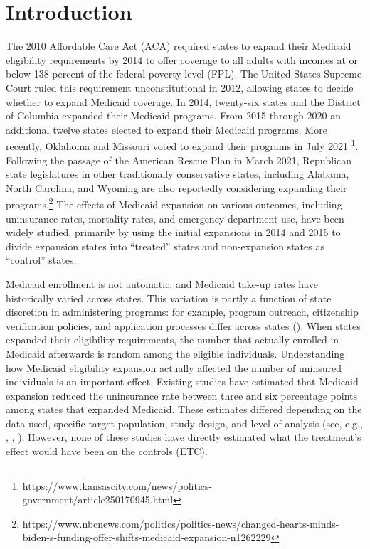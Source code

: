 \documentclass[aoas]{imsart}
\theoremstyle{plain}
\theoremstyle{remark}
\begin{document}


\section{Introduction}

The 2010 Affordable Care Act (ACA) required states to expand their Medicaid eligibility requirements by 2014 to offer coverage to all adults with incomes at or below 138 percent of the federal poverty level (FPL). The United States Supreme Court ruled this requirement unconstitutional in 2012, allowing states to decide whether to expand Medicaid coverage. In 2014, twenty-six states and the District of Columbia expanded their Medicaid programs. From 2015 through 2020 an additional twelve states elected to expand their Medicaid programs. More recently, Oklahoma and Missouri voted to expand their programs in July 2021 \footnote{https://www.kansascity.com/news/politics-government/article250170945.html}. Following the passage of the American Rescue Plan in March 2021, Republican state legislatures in other traditionally conservative states, including Alabama, North Carolina, and Wyoming are also reportedly considering expanding their programs.\footnote{https://www.nbcnews.com/politics/politics-news/changed-hearts-minds-biden-s-funding-offer-shifts-medicaid-expansion-n1262229} The effects of Medicaid expansion on various outcomes, including uninsurance rates, mortality rates, and emergency department use, have been widely studied, primarily by using the initial expansions in 2014 and 2015 to divide expansion states into ``treated'' states and non-expansion states as ``control'' states. 

Medicaid enrollment is not automatic, and Medicaid take-up rates have historically varied across states. This variation is partly a function of state discretion in administering programs: for example, program outreach, citizenship verification policies, and application processes differ across states (\cite{courtemanche2017early}). When states expanded their eligibility requirements, the number that actually enrolled in Medicaid afterwards is random among the eligible individuals. Understanding how Medicaid eligibility expansion actually affected the number of uninsured individuals is an important effect. Existing studies have estimated that Medicaid expansion reduced the uninsurance rate between three and six percentage points among states that expanded Medicaid. These estimates differed depending on the data used, specific target population, study design, and level of analysis (see, e.g., \cite{kaestner2017effects}, \cite{courtemanche2017early}, \cite{frean2017premium}). However, none of these studies have directly estimated what the treatment's effect would have been on the controls (ETC). 
\end{document}
